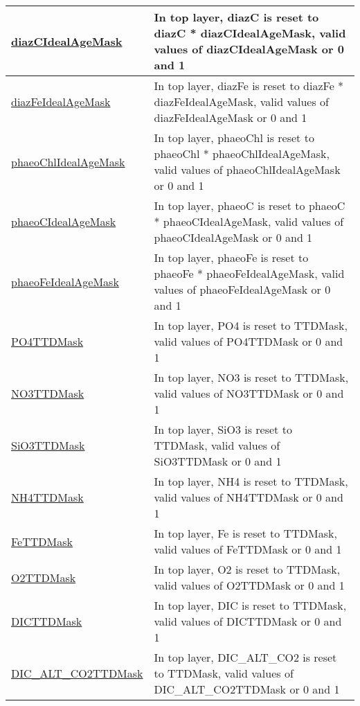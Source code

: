 {\begin{center}
\begin{longtable}{| p{2.0in} | p{4.0in} |}
    \hline
    \hyperref[subsec:var_sec_forcing_diazCIdealAgeMask]{diazCIdealAgeMask} & In top layer, diazC is reset to diazC * diazCIdealAgeMask, valid values of diazCIdealAgeMask or 0 and 1 \\
    \hline
    \hyperref[subsec:var_sec_forcing_diazFeIdealAgeMask]{diazFeIdealAgeMask} & In top layer, diazFe is reset to diazFe * diazFeIdealAgeMask, valid values of diazFeIdealAgeMask or 0 and 1 \\
    \hline
    \hyperref[subsec:var_sec_forcing_phaeoChlIdealAgeMask]{phaeoChlIdealAgeMask} & In top layer, phaeoChl is reset to phaeoChl * phaeoChlIdealAgeMask, valid values of phaeoChlIdealAgeMask or 0 and 1 \\
    \hline
    \hyperref[subsec:var_sec_forcing_phaeoCIdealAgeMask]{phaeoCIdealAgeMask} & In top layer, phaeoC is reset to phaeoC * phaeoCIdealAgeMask, valid values of phaeoCIdealAgeMask or 0 and 1 \\
    \hline
    \hyperref[subsec:var_sec_forcing_phaeoFeIdealAgeMask]{phaeoFeIdealAgeMask} & In top layer, phaeoFe is reset to phaeoFe * phaeoFeIdealAgeMask, valid values of phaeoFeIdealAgeMask or 0 and 1 \\
    \hline
    \hyperref[subsec:var_sec_forcing_PO4TTDMask]{PO4TTDMask} & In top layer, PO4 is reset to TTDMask, valid values of PO4TTDMask or 0 and 1 \\
    \hline
    \hyperref[subsec:var_sec_forcing_NO3TTDMask]{NO3TTDMask} & In top layer, NO3 is reset to TTDMask, valid values of NO3TTDMask or 0 and 1 \\
    \hline
    \hyperref[subsec:var_sec_forcing_SiO3TTDMask]{SiO3TTDMask} & In top layer, SiO3 is reset to TTDMask, valid values of SiO3TTDMask or 0 and 1 \\
    \hline
    \hyperref[subsec:var_sec_forcing_NH4TTDMask]{NH4TTDMask} & In top layer, NH4 is reset to TTDMask, valid values of NH4TTDMask or 0 and 1 \\
    \hline
    \hyperref[subsec:var_sec_forcing_FeTTDMask]{FeTTDMask} & In top layer, Fe is reset to TTDMask, valid values of FeTTDMask or 0 and 1 \\
    \hline
    \hyperref[subsec:var_sec_forcing_O2TTDMask]{O2TTDMask} & In top layer, O2 is reset to TTDMask, valid values of O2TTDMask or 0 and 1 \\
    \hline
    \hyperref[subsec:var_sec_forcing_DICTTDMask]{DICTTDMask} & In top layer, DIC is reset to TTDMask, valid values of DICTTDMask or 0 and 1 \\
    \hline
    \hyperref[subsec:var_sec_forcing_DIC_ALT_CO2TTDMask]{DIC\_ALT\_CO2TTDMask} & In top layer, DIC\_ALT\_CO2 is reset to TTDMask, valid values of DIC\_ALT\_CO2TTDMask or 0 and 1 \\

\end{longtable}
\end{center}}
